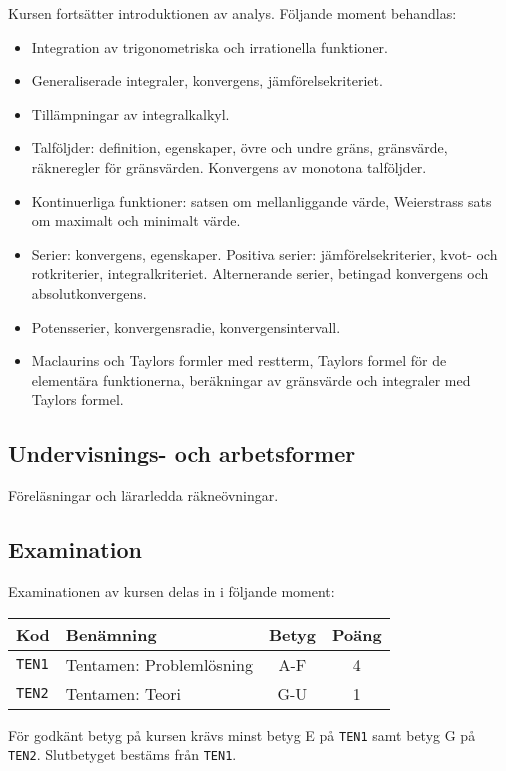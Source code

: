 Kursen fortsätter introduktionen av analys. Följande moment behandlas:

\begin{itemize}
\tightlist
\item
  Integration av trigonometriska och irrationella funktioner.
\item
  Generaliserade integraler, konvergens, jämförelsekriteriet.
\item
  Tillämpningar av integralkalkyl.
\item
  Talföljder: definition, egenskaper, övre och undre gräns, gränsvärde,
  räkneregler för gränsvärden. Konvergens av monotona talföljder.
\item
  Kontinuerliga funktioner: satsen om mellanliggande värde, Weierstrass
  sats om maximalt och minimalt värde.
\item
  Serier: konvergens, egenskaper. Positiva serier: jämförelsekriterier,
  kvot- och rotkriterier, integralkriteriet. Alternerande serier,
  betingad konvergens och absolutkonvergens.
\item
  Potensserier, konvergensradie, konvergensintervall.
\item
  Maclaurins och Taylors formler med restterm, Taylors formel för de
  elementära funktionerna, beräkningar av gränsvärde och integraler med
  Taylors formel.
\end{itemize}

\subsection*{Undervisnings- och
arbetsformer}

Föreläsningar och lärarledda räkneövningar.

\subsection*{Examination}

Examinationen av kursen delas in i följande moment:

\begin{longtable}[]{@{}llcc@{}}
\toprule
\textsf{Kod} & \textsf{Benämning} & \textsf{Betyg} & \textsf{Poäng}\tabularnewline
\midrule
\endhead
\texttt{TEN1} & Tentamen: Problemlösning & A-F & 4\tabularnewline
\texttt{TEN2} & Tentamen: Teori & G-U & 1\tabularnewline
\bottomrule
\end{longtable}

För godkänt betyg på kursen krävs minst betyg E på \texttt{TEN1} samt betyg G på
\texttt{TEN2}. Slutbetyget bestäms från \texttt{TEN1}.

